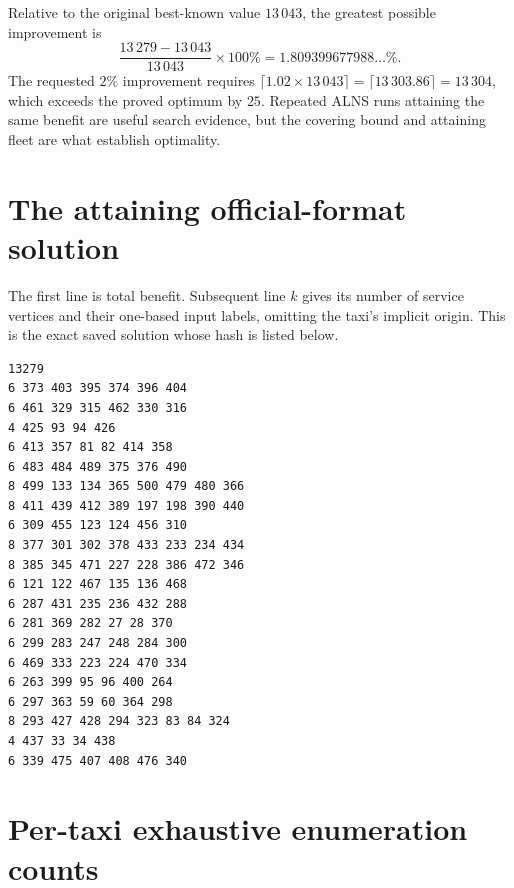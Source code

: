 \documentclass[11pt,a4paper]{article}
\begin{document}
Relative to the original best-known value $13\,043$, the greatest possible
improvement is
\[
 \frac{13\,279-13\,043}{13\,043}\times100\%
 =1.809399677988\ldots\%.
\]
The requested $2\%$ improvement requires
$\lceil1.02\times13\,043\rceil=\lceil13\,303.86\rceil=13\,304$,
which exceeds the proved optimum by $25$. Repeated ALNS runs attaining the
same benefit are useful search evidence, but the covering bound and attaining
fleet are what establish optimality.

\appendix
\section{The attaining official-format solution}\label{sec:solution}

The first line is total benefit. Subsequent line $k$ gives its number of
service vertices and their one-based input labels, omitting the taxi's
implicit origin. This is the exact saved solution whose hash is listed below.
\begin{verbatim}
13279
6 373 403 395 374 396 404
6 461 329 315 462 330 316
4 425 93 94 426
6 413 357 81 82 414 358
6 483 484 489 375 376 490
8 499 133 134 365 500 479 480 366
8 411 439 412 389 197 198 390 440
6 309 455 123 124 456 310
8 377 301 302 378 433 233 234 434
8 385 345 471 227 228 386 472 346
6 121 122 467 135 136 468
6 287 431 235 236 432 288
6 281 369 282 27 28 370
6 299 283 247 248 284 300
6 469 333 223 224 470 334
6 263 399 95 96 400 264
6 297 363 59 60 364 298
8 293 427 428 294 323 83 84 324
4 437 33 34 438
6 339 475 407 408 476 340
\end{verbatim}

\section{Per-taxi exhaustive enumeration counts}\label{sec:counts}
\end{document}
